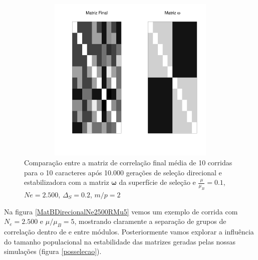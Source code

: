 \begin{figure}[htbp]
    \centering
    \includegraphics[width=150mm, height=80mm]{figuras/RMu01Omega}
    \caption{Comparação entre a matriz de correlação final média de 10
        corridas para o 10 caracteres após 10.000 gerações de seleção direcional e
        estabilizadora com a matriz $\pmb{\omega}$ da superfície de seleção e
    $\frac{\mu}{\mu_B}=0.1$, $Ne=2.500$, $\Delta_S=0.2$, $m/p=2$}
    \label{RMu01}
\end{figure}

Na figura \ref{MatBDirecionalNe2500RMu5} vemos um exemplo de corrida com
$N_e = 2.500$ e $\mu/\mu_B=5$, mostrando claramente a separação de grupos
de correlação dentro de e entre módulos.
Posteriormente vamos explorar a influência do tamanho populacional na
estabilidade das matrizes geradas pelas nossas simulações (figura
\ref{posselecao}).

